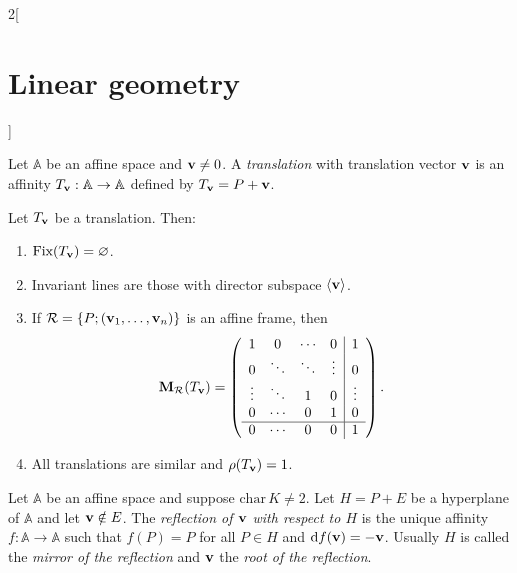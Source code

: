 \documentclass[../../../main.tex]{subfiles}
\begin{document}
\begin{multicols}{2}[\section{Linear geometry}]
\begin{definition}
    \end{definition}
    \begin{definition}[Translations]
        Let $\mathbb{A}$ be an affine space and $\boldsymbol{\mathrm{v}}\ne 0$. A \textit{translation} with translation vector $\boldsymbol{\mathrm{v}}$ is an affinity $T_{\boldsymbol{\mathrm{v}}}:\mathbb{A}\rightarrow\mathbb{A}$ defined by $T_{\boldsymbol{\mathrm{v}}}=P+\boldsymbol{\mathrm{v}}$.
    \end{definition}
    \begin{prop}
        Let $T_{\boldsymbol{\mathrm{v}}}$ be a translation. Then:
        \begin{enumerate}
            \item $\text{Fix}(T_{\boldsymbol{\mathrm{v}}})=\varnothing$.
            \item Invariant lines are those with director subspace $\langle\boldsymbol{\mathrm{v}}\rangle$.
            \item If $\mathcal{R}=\{P;(\boldsymbol{\mathrm{v}}_1,\ldots,\boldsymbol{\mathrm{v}}_n)\}$ is an affine frame, then $$\boldsymbol{\mathrm{M}}_\mathcal{R}(T_{\boldsymbol{\mathrm{v}}})=\left(\begin{array}{cccc|c}
                              1      & 0      & \cdots & 0      & 1      \\
                              0      & \ddots & \ddots & \vdots & 0      \\
                              \vdots & \ddots & 1      & 0      & \vdots \\
                              0      & \cdots & 0      & 1      & 0      \\
                              \hline
                              0      & \cdots & 0      & 0      & 1
                          \end{array}\right).$$
            \item All translations are similar and $\rho(T_{\boldsymbol{\mathrm{v}}})=1$.
        \end{enumerate}
    \end{prop}
    \begin{definition}[Reflections]
        Let $\mathbb{A}$ be an affine space and suppose $\text{char}\,K\ne 2$. Let $H=P+E$ be a hyperplane of $\mathbb{A}$ and let $\boldsymbol{\mathrm{v}}\notin E$. The \textit{reflection of $\boldsymbol{\mathrm{v}}$ with respect to $H$} is the unique affinity $f:\mathbb{A}\rightarrow\mathbb{A}$ such that $f(P)=P$ for all $P\in H$ and $\dd f(\boldsymbol{\mathrm{v}})=-\boldsymbol{\mathrm{v}}$. Usually $H$ is called the \textit{mirror of the reflection} and $\boldsymbol{\mathrm{v}}$ the \textit{root of the reflection}.
    \end{definition}
    \begin{prop}

\end{prop}
\end{multicols}
\end{document}
